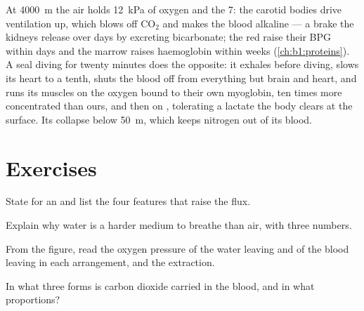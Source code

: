 \begin{example}\label{ex:b1:gas-exchange:altitudediving}
At \qty{4000}{m} the air holds \qty{12}{kPa} of oxygen and the 
\qty{7}{}: the carotid bodies drive ventilation up, which blows off
$\mathrm{CO_2}$ and makes the blood alkaline --- a brake the kidneys
release over days by excreting bicarbonate; the red  raise their
BPG within days and the marrow raises haemoglobin within weeks
(\cref{ch:b1:proteins}). A seal diving for twenty minutes does the
opposite: it exhales before diving, slows its heart to a tenth, shuts
the blood off from everything but brain and heart, and runs its
muscles on the oxygen bound to their own myoglobin, ten times more
concentrated than ours, and then on , tolerating a lactate
the body clears at the surface. Its  collapse below \qty{50}{m},
which keeps nitrogen out of its blood.
\end{example}

\section{Exercises}

\begin{exercise}[$\star$]\label{exo:b1:gas-exchange:1}
State  for an  and list the four features
that raise the flux.
\end{exercise}

\begin{exercise}[$\star$]\label{exo:b1:gas-exchange:2}
Explain why water is a harder medium to breathe than air, with three
numbers.
\end{exercise}

\begin{exercise}[$\star$]\label{exo:b1:gas-exchange:3}
From the  figure, read the oxygen pressure of the water
leaving and of the blood leaving in each arrangement, and the
extraction.
\end{exercise}

\begin{exercise}[$\star$]\label{exo:b1:gas-exchange:4}
In what three forms is carbon dioxide carried in the blood, and in
what proportions?
\end{exercise}

